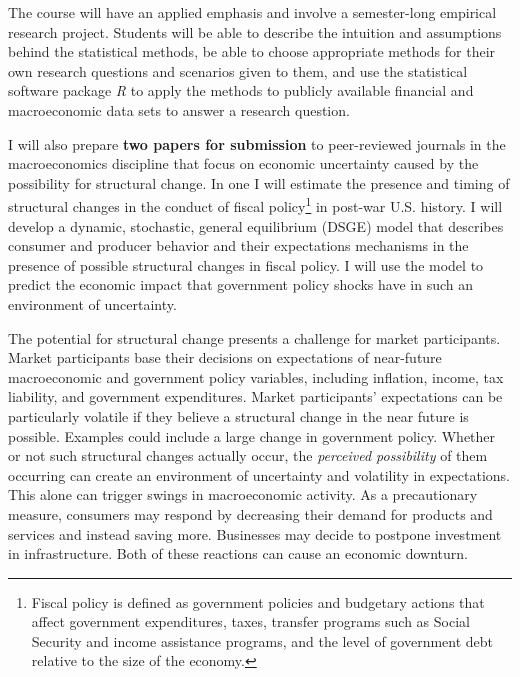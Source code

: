 \documentclass[11pt]{article}
\begin{document}
The course will have an applied emphasis and involve a semester-long empirical research project.  Students will be able to describe the intuition and assumptions behind the statistical methods, be able to choose appropriate methods for their own research questions and scenarios given to them, and use the statistical software package \textit{R} to apply the methods to publicly available financial and macroeconomic data sets to answer a research question.

I will also prepare \textbf{two papers for submission} to peer-reviewed journals in the macroeconomics discipline that focus on economic uncertainty caused by the possibility for structural change.  In one I will estimate the presence and timing of structural changes in the conduct of fiscal policy\footnote{Fiscal policy is defined as government policies and budgetary actions that affect government expenditures, taxes, transfer programs such as Social Security and income assistance programs, and the level of government debt relative to the size of the economy.} in post-war U.S. history.  I will develop a dynamic, stochastic, general equilibrium (DSGE) model that describes consumer and producer behavior and their expectations mechanisms in the presence of possible structural changes in fiscal policy.  I will use the model to predict the economic impact that government policy shocks have in such an environment of uncertainty.

The potential for structural change presents a challenge for market participants.  Market participants base their decisions on expectations of near-future macroeconomic and government policy variables, including inflation, income, tax liability, and government expenditures.  Market participants' expectations can be particularly volatile if they believe a structural change in the near future is possible.  Examples could include a large change in government policy.  Whether or not such structural changes actually occur, the \textit{perceived possibility} of them occurring can create an environment of uncertainty and volatility in expectations.  This alone can trigger swings in macroeconomic activity.  As a precautionary measure, consumers may respond by decreasing their demand for products and services and instead saving more.  Businesses may decide to postpone investment in infrastructure.  Both of these reactions can cause an economic downturn.
\end{document}
